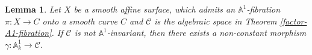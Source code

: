 \documentclass[11pt, reqno]{amsart}
\theoremstyle{plain}
\newtheorem{lemma}[thm]{Lemma}
\theoremstyle{definition}
\newtheorem{remark}[thm]{Remark}
\newtheorem{definition}[thm]{Definition}
\newcommand{\Spec}{{\rm Spec \,}}
\newcommand{\sC}{{\mathcal C}}
\newcommand{\A}{{\mathbb A}}
\newcommand{\C}{{\mathbb C}}
\begin{document}



\begin{lemma}\label{not-a1-rigid}
	Let $X$ be a smooth affine surface, which admits an $\mathbb{A}^1$-fibration $\pi: X \to C$ onto a  
	smooth curve $C$ and
	$\sC$ is the algebraic space 
	in Theorem \ref{factor-A1-fibration}. If $\sC$ is not $\A^1$-invariant, then there exists a non-constant morphism $\gamma:\A^1_k \to \sC$.
\end{lemma}
\end{document}
